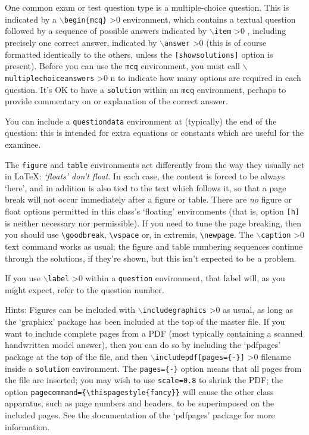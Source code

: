 \documentclass[10pt]{scrartcl}
\makeatletter
\def\csarg#1{\texttt\{\textit{#1}\texttt\}%
  \advance\@tempcnta-1
  \ifnum\@tempcnta>0
    \let\next\csarg
  \else
    \let\next\endgroup          %
  \fi
  \next}
\newcommand\cs[2][0]{\begingroup
  \color{cscolour}%
  $\backslash$\texttt{#2}%
  \@tempcnta=#1
  \ifnum\@tempcnta>0
    \let\next\csarg
  \else
    \let\next\endgroup
  \fi
  \next}
\def\env#1{\texttt{\textcolor{cscolour}{#1}}}
\def\opt#1{\texttt{[#1]}}
\makeatother
\begin{document}
One common exam or test question type is a multiple-choice question.
This is indicated by a \cs{begin\{mcq\}} environment, which contains a
textual question followed by a sequence of possible answers indicated by
\cs{item}, including precisely one correct answer, indicated by
\cs{answer} (this is of course formatted identically to the others,
unless the \opt{showsolutions} option is present).  Before you can use
the \env{mcq} environment, you must call
\cs[1]{multiplechoiceanswers}{n} to indicate how many options are
required in each question.
It's OK to have a \env{solution} within an \env{mcq} environment,
perhaps to provide commentary on or explanation of the correct answer.

You can include a \env{questiondata} environment at (typically) the end of
the question: this is intended for extra equations or constants which
are useful for the examinee.

The \env{figure} and \env{table} environments act differently from the
way they usually act in \LaTeX: \emph{`floats' don't float}.  In each
case, the content is forced to be always `here', and in addition is
also tied to the text which follows it, so that a page break will not
occur immediately after a figure or table.  There are \emph{no} figure
or float options permitted in this class's `floating' environments
(that is, option \texttt{[h]} is neither necessary nor permissible).
If you need to tune the page breaking, then you should use
\verb|\goodbreak|, \verb|\vspace| or, in extremis, \verb|\newpage|.
The \cs[1]{caption}{text} command works as usual; the figure and table
numbering sequences continue through the solutions, if they're shown,
but this isn't expected to be a problem.

If you use \cs{label} within a \env{question} environment, that label
will, as you might expect, refer to the question number.

Hints:
Figures can be included with \cs{includegraphics} as usual, as long as
the `graphicx' package has been included at the top of the master
file.  If you want to include complete pages from a PDF (most
typically containing a scanned handwritten model answer), then you can
do so by including the `pdfpages' package at the top of the file, and
then \cs[1]{includepdf[pages=\{-\}]}{filename} inside a \env{solution}
environment.
The \texttt{pages=\{-\}} option means that all pages from the file are
inserted; you may wish to use \texttt{scale=0.8} to shrink the PDF;
the option \verb|pagecommand={\thispagestyle{fancy}}| will cause the other
class apparatus, such as page numbers and headers, to be
superimposed on the included pages.
See the documentation of the `pdfpages' package for more information.
\end{document}
